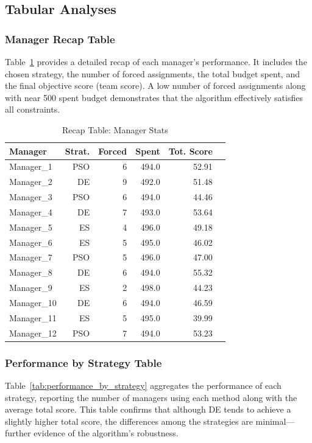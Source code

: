 \documentclass[sigconf]{acmart}
\begin{document}
\subsection{Tabular Analyses}

\subsubsection{Manager Recap Table}
Table~\ref{tab:recap_manager} provides a detailed recap of each manager's performance. It includes the chosen strategy, the number of forced assignments, the total budget spent, and the final objective score (team score). A low number of forced assignments along with near 500 spent budget demonstrates that the algorithm effectively satisfies all constraints.

\begin{table}[H]
	\centering
	\caption{Recap Table: Manager Stats}
	\label{tab:recap_manager}
	\begin{tabular}{lrrrrr}
		\toprule
		\textbf{Manager} & \textbf{Strat.} & \textbf{Forced} & \textbf{Spent} & \textbf{Tot. Score} \\
		\midrule
		Manager\_1  & PSO & 6 & 494.0 & 52.91 \\
		Manager\_2  & DE  & 9 & 492.0 & 51.48 \\
		Manager\_3  & PSO & 6 & 494.0 & 44.46 \\
		Manager\_4  & DE  & 7 & 493.0 & 53.64 \\
		Manager\_5  & ES  & 4 & 496.0 & 49.18 \\
		Manager\_6  & ES  & 5 & 495.0 & 46.02 \\
		Manager\_7  & PSO & 5 & 496.0 & 47.00 \\
		Manager\_8  & DE  & 6 & 494.0 & 55.32 \\
		Manager\_9  & ES  & 2 & 498.0 & 44.23 \\
		Manager\_10 & DE  & 6 & 494.0 & 46.59 \\
		Manager\_11 & ES  & 5 & 495.0 & 39.99 \\
		Manager\_12 & PSO & 7 & 494.0 & 53.23 \\
		\bottomrule
	\end{tabular}
\end{table}

\subsubsection{Performance by Strategy Table}
Table~\ref{tab:performance_by_strategy} aggregates the performance of each strategy, reporting the number of managers using each method along with the average total score. This table confirms that although DE tends to achieve a slightly higher total score, the differences among the strategies are minimal—further evidence of the algorithm's robustness.
\end{document}
